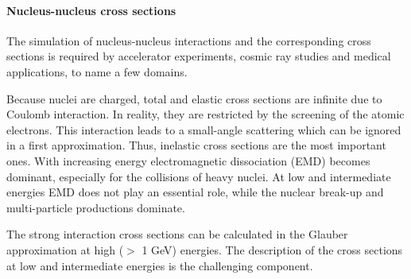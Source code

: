 \paragraph{Nucleus-nucleus cross sections}
The simulation of nucleus-nucleus interactions and the corresponding cross
sections is required by accelerator experiments, cosmic ray studies and 
medical applications, to name a few domains.

Because nuclei are charged, total and elastic cross sections are
infinite due to Coulomb interaction. In reality, they are restricted
by the screening of the atomic electrons. This interaction leads to a
small-angle scattering which can be ignored in a first approximation.
Thus, inelastic cross sections are the most important ones.
With increasing energy electromagnetic dissociation (EMD) becomes dominant,
especially for the collisions of heavy nuclei.  At low and intermediate energies
EMD does not play an essential role, while the nuclear break-up and 
multi-particle productions dominate.

The strong interaction cross sections can be calculated in the Glauber 
approximation \cite{hadbib:AntiA5,hadbib:AAx4} at high ($>$ 1 GeV) energies.
The description of the cross sections at low and intermediate energies is the
challenging component.


